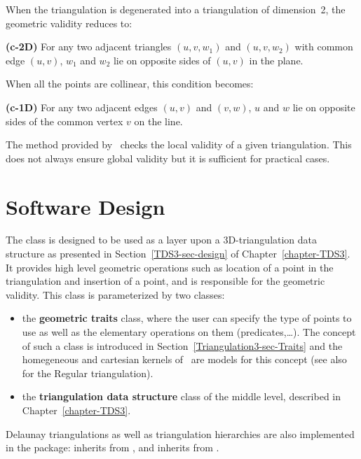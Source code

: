When the triangulation is degenerated into a triangulation of
dimension~2, the  geometric validity reduces to:

{\bf (c-2D)} For any two adjacent triangles $(u,v,w_1)$ and $(u,v,w_2)$ with
common edge $(u,v)$, $w_1$ and $w_2$ lie on opposite sides of $(u,v)$
in the plane.

When all the points are collinear, this condition becomes:

{\bf (c-1D)} For any two adjacent edges $(u,v)$ and $(v,w)$, $u$ and
$w$ lie on opposite sides of the common vertex $v$ on the line.

The  method provided by \cgal\ checks the local
validity of a given triangulation. This does not always
ensure global validity \cite{mnssssu-cgpvg-96,dlpt-ccpps-98} but it is 
sufficient for practical cases.

\section{Software Design}
\label{Triangulation3-sec-design}

The class  is
designed to be used as  
a layer upon a 3D-triangulation data structure as presented in 
Section~\ref{TDS3-sec-design} of Chapter~\ref{chapter-TDS3}.
It provides high level geometric operations such as location of a point
in the triangulation and insertion of a point, and is responsible for
the geometric validity. This class is parameterized by two classes:
\begin{itemize}
\item {} the \textbf{geometric traits} class, where the user can
specify the type of points to use as well as the elementary
operations on them (predicates,\ldots). The concept of such a class is
introduced in Section~\ref{Triangulation3-sec-Traits} and the homegeneous and cartesian
kernels of \cgal\ are models for this concept
(see also  
for the Regular triangulation).
\item {} the \textbf{triangulation data structure} class of the middle level, 
described in Chapter~\ref{chapter-TDS3}.
\end{itemize}	

Delaunay triangulations as well as triangulation hierarchies
\cite{d-iirdt-98} are also implemented in the package: 
inherits from  
, and 
 inherits from .

